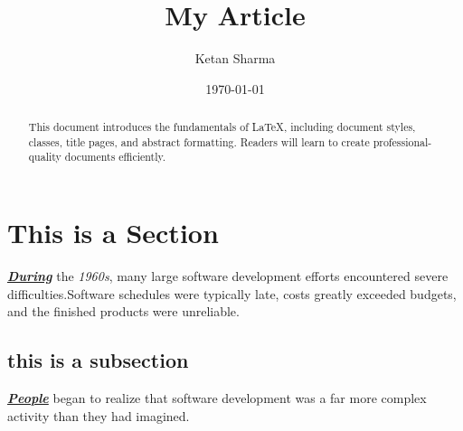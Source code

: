 \documentclass[12pt]{article}
\title{My Article}
\author{Ketan Sharma}
\date{\today}
\begin{document}
	\maketitle
	\begin{abstract}
		This document introduces the fundamentals of
		\LaTeX, including document styles, classes, title
		pages, and abstract formatting. Readers will
		learn to create professional-quality documents
		efficiently.
	\end{abstract}
	\pagebreak
	\section{This is a Section}
	\noindent
	\underline{\textbf{\textit{During}}} the \emph{1960s}, many large software development efforts encountered severe difficulties.Software schedules were
	typically late, costs greatly exceeded budgets, and the finished products were unreliable.
	\subsection{this is a subsection}
	\noindent
	\underline{\textbf{\textit{People}}} began to realize that software development was a
	far more complex activity than they had imagined.
\end{document}
